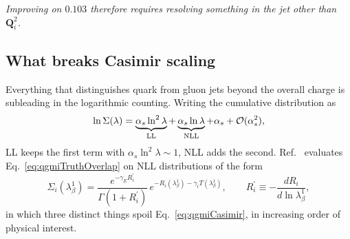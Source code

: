 \emph{Improving on \(0.103\) therefore requires resolving something in the jet other
than \(\mathbf{Q}_i^2\).}

\subsection{What breaks Casimir scaling}
\label{subsec:qgmiNLL}

Everything that distinguishes quark from gluon jets beyond the overall charge is
subleading in the logarithmic counting. Writing the cumulative distribution as
\begin{equation}
	\ln\Sigma(\lambda) = \underbrace{\alpha_s\ln^2\lambda}_{\rm LL}
	+ \underbrace{\alpha_s\ln\lambda}_{\rm NLL}
	+ \alpha_s + \mathcal{O}(\alpha_s^2) ,
	\label{eq:qgmiLogCounting}
\end{equation}
LL keeps the first term with \(\alpha_s\ln^2\lambda\sim1\), NLL adds the second.
Ref.~\cite{Larkoski_2014} evaluates Eq.~\ref{eq:qgmiTruthOverlap} on NLL
distributions of the form
\begin{equation}
	\Sigma_i(\lambda^1_\beta) =
	\frac{e^{-\gamma_E R_i^\prime}}{\Gamma(1+R_i^\prime)}\,
	e^{-R_i(\lambda^1_\beta)-\gamma_i T(\lambda^1_\beta)} ,
	\qquad
	R_i^\prime \equiv -\frac{dR_i}{d\ln\lambda^1_\beta} ,
	\label{eq:qgmiNLLcum}
\end{equation}
in which three distinct things spoil Eq.~\ref{eq:qgmiCasimir}, in increasing order of
physical interest.

